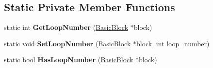 \subsection*{Static Private Member Functions}
\begin{DoxyCompactItemize}
\item 
static int {\bfseries Get\+Loop\+Number} (\hyperlink{classv8_1_1internal_1_1compiler_1_1_basic_block}{Basic\+Block} $\ast$block)\hypertarget{classv8_1_1internal_1_1compiler_1_1_special_r_p_o_numberer_a7aee5f97bf888e8440b09a85cfc074f8}{}\label{classv8_1_1internal_1_1compiler_1_1_special_r_p_o_numberer_a7aee5f97bf888e8440b09a85cfc074f8}

\item 
static void {\bfseries Set\+Loop\+Number} (\hyperlink{classv8_1_1internal_1_1compiler_1_1_basic_block}{Basic\+Block} $\ast$block, int loop\+\_\+number)\hypertarget{classv8_1_1internal_1_1compiler_1_1_special_r_p_o_numberer_afdb853b183e8bb5c277bc9fed9579441}{}\label{classv8_1_1internal_1_1compiler_1_1_special_r_p_o_numberer_afdb853b183e8bb5c277bc9fed9579441}

\item 
static bool {\bfseries Has\+Loop\+Number} (\hyperlink{classv8_1_1internal_1_1compiler_1_1_basic_block}{Basic\+Block} $\ast$block)\hypertarget{classv8_1_1internal_1_1compiler_1_1_special_r_p_o_numberer_a17d49e4c9ee7b70593afe60538f37b16}{}\label{classv8_1_1internal_1_1compiler_1_1_special_r_p_o_numberer_a17d49e4c9ee7b70593afe60538f37b16}

\end{DoxyCompactItemize}
